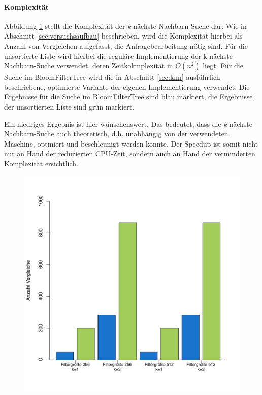 \paragraph*{Komplexität}
Abbildung \ref{fig:pic19} stellt die Komplexität der \textit{k}-nächste-Nachbarn-Suche dar. Wie in Abschnitt \ref{sec:versuchsaufbau} beschrieben, wird die Komplexität hierbei als Anzahl von Vergleichen aufgefasst, die Anfragebearbeitung nötig sind. Für die unsortierte Liste wird hierbei die reguläre Implementierung der k-nächste-Nachbarn-Suche verwendet, deren Zeitkokmplexität in $O(n^2)$ liegt. Für die Suche im BloomFilterTree wird die in Abschnitt \ref{sec:knn} ausführlich beschriebene, optimierte Variante der eigenen Implementierung verwendet. Die Ergebnisse für die Suche im BloomFilterTree sind blau markiert, die Ergebnisse der unsortierten Liste sind grün markiert.

Ein niedriges Ergebnis ist hier wünschenswert. Das bedeutet, dass die \textit{k}-nächste-Nachbarn-Suche auch theoretisch, d.h. unabhängig von der verwendeten Maschine, optmiert und beschleunigt werden konnte. Der Speedup ist somit nicht nur an Hand der reduzierten CPU-Zeit, sondern auch an Hand der verminderten Komplexität ersichtlich. 
\begin{figure}[hptb]
	\centering
	\label{fig:pic19}
	\includegraphics[scale=0.7]{pictures/compl.pdf}
\end{figure}
\newpage

